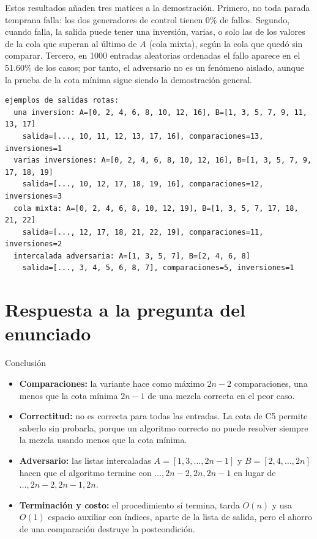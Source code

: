 \documentclass[11pt]{article}
\begin{document}
Estos resultados añaden tres matices a la demostración. Primero, no toda parada temprana falla: los dos
generadores de control tienen 0\% de fallos. Segundo, cuando falla, la salida puede tener una inversión, varias, o solo
las de los valores de la cola que superan al último de $A$ (cola mixta), según la cola que quedó sin comparar. Tercero, en 1000 entradas
aleatorias ordenadas el fallo aparece en el 51.60\% de los casos; por tanto, el adversario no es un fenómeno
aislado, aunque la prueba de la cota mínima sigue siendo la demostración general.

\begin{lstlisting}[style=salida]
ejemplos de salidas rotas:
  una inversion: A=[0, 2, 4, 6, 8, 10, 12, 16], B=[1, 3, 5, 7, 9, 11, 13, 17]
    salida=[..., 10, 11, 12, 13, 17, 16], comparaciones=13, inversiones=1
  varias inversiones: A=[0, 2, 4, 6, 8, 10, 12, 16], B=[1, 3, 5, 7, 9, 17, 18, 19]
    salida=[..., 10, 12, 17, 18, 19, 16], comparaciones=12, inversiones=3
  cola mixta: A=[0, 2, 4, 6, 8, 10, 12, 19], B=[1, 3, 5, 7, 17, 18, 21, 22]
    salida=[..., 12, 17, 18, 21, 22, 19], comparaciones=11, inversiones=2
  intercalada adversaria: A=[1, 3, 5, 7], B=[2, 4, 6, 8]
    salida=[..., 3, 4, 5, 6, 8, 7], comparaciones=5, inversiones=1
\end{lstlisting}

\section*{Respuesta a la pregunta del enunciado}

\begin{resultado}{Conclusión}
\begin{itemize}[leftmargin=14pt]
\item \textbf{Comparaciones:} la variante hace como máximo $2n-2$ comparaciones, una menos que la cota
mínima $2n-1$ de una mezcla correcta en el peor caso.
\item \textbf{Correctitud:} no es correcta para todas las entradas. La cota de C5 permite saberlo sin
probarla, porque un algoritmo correcto no puede resolver siempre la mezcla usando menos que la cota mínima.
\item \textbf{Adversario:} las listas intercaladas $A=[1,3,\ldots,2n-1]$ y
$B=[2,4,\ldots,2n]$ hacen que el algoritmo termine con $\dots,2n-2,2n,2n-1$ en lugar de
$\dots,2n-2,2n-1,2n$.
\item \textbf{Terminación y costo:} el procedimiento sí termina, tarda $O(n)$ y usa $O(1)$ espacio
auxiliar con índices, aparte de la lista de salida, pero el ahorro de una comparación destruye la postcondición.
\end{itemize}
\end{resultado}
\end{document}
